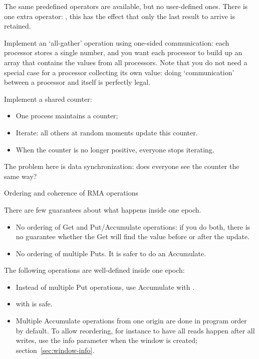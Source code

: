 The same predefined operators are available, but no
user-defined ones. There is one extra operator: ,
this has the effect that only the last result to arrive is retained.

\begin{exercise}
  Implement an `all-gather' operation using one-sided communication:
  each processor stores a single number, and you want each processor
  to build up an array that contains the values from all
  processors. Note that you do not need a special case for a processor
  collecting its own value: doing `communication' between a processor
  and itself is perfectly legal.
\end{exercise}

\begin{exercise}
  \label{ex:countdown}

  Implement a shared counter:
  \begin{itemize}
  \item One process maintains a counter;
  \item Iterate: all others at random moments update this counter.
  \item When the counter is no longer positive, everyone stops iterating.
  \end{itemize}
  The problem here is data synchronization: does everyone see the
  counter the same way?
\end{exercise}

 {Ordering and coherence of RMA operations}

There are few guarantees about what happens inside one epoch.
\begin{itemize}
\item No ordering of Get and Put/Accumulate operations: if you do
  both, there is no guarantee whether the Get will find the value
  before or after the update.
\item No ordering of multiple Puts. It is safer to do an Accumulate.
\end{itemize}
The following operations are well-defined inside one epoch:
\begin{itemize}
\item Instead of multiple Put operations, use Accumulate with
  .
\item {} with
   is safe.
\item Multiple Accumulate operations from one origin are done in
  program order by default. To allow reordering, for instance to have
  all reads happen after all writes, use the info parameter
  when the window is created; section~\ref{sec:window-info}.
\end{itemize}

